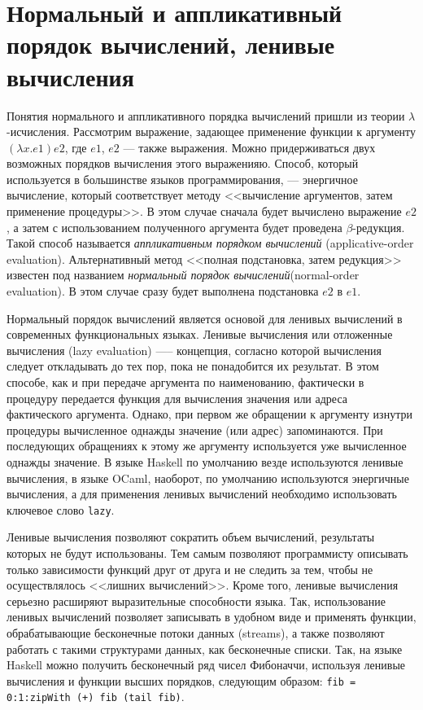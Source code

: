 \documentclass[a4paper]{article}
\begin{document}
\section{Нормальный и аппликативный порядок вычислений, ленивые
  вычисления}
Понятия нормального и аппликативного порядка вычислений пришли из
теории $\lambda$-исчисления. Рассмотрим выражение, задающее
применение функции к аргументу $(\lambda x. e1) e2$, где $e1$, $e2$
--- также выражения. Можно придерживаться двух возможных порядков
вычисления этого выраженияю. Способ, который используется в
большинстве языков программирования, --- энергичное вычисление,
который соответствует методу <<вычисление аргументов, затем применение
процедуры>>. В этом случае сначала будет вычислено выражение $e2$, а
затем с использованием полученного аргумента будет проведена
$\beta$-редукция. Такой способ называется \emph{аппликативным порядком
вычислений} (applicative-order evaluation).
Альтернативный метод <<полная подстановка, затем редукция>> известен
под названием \emph{нормальный порядок вычислений}(normal-order
evaluation). В этом случае сразу будет выполнена подстановка $e2$ в
$e1$.

Нормальный порядок вычислений является основой для ленивых вычислений
в современных функциональных языках. Ленивые вычисления или отложенные
вычисления (lazy evaluation) —-- концепция, согласно которой
вычисления следует откладывать до тех пор, пока не понадобится их
результат. В этом способе, как и при передаче аргумента по
наименованию, фактически в процедуру передается функция для вычисления
значения или адреса фактического аргумента. Однако, при первом же
обращении к аргументу изнутри процедуры вычисленное однажды значение
(или адрес) запоминаются. При последующих обращениях к этому же
аргументу используется уже вычисленное однажды значение. В языке
Haskell по умолчанию везде используются ленивые вычисления, в языке
OCaml, наоборот, по умолчанию используются энергичные вычисления, а
для применения ленивых вычислений необходимо использовать ключевое
слово \texttt{lazy}.

Ленивые вычисления позволяют сократить объем вычислений, результаты
которых не будут использованы. Тем самым позволяют программисту
описывать только зависимости функций друг от друга и не следить за
тем, чтобы не осуществлялось <<лишних вычислений>>. Кроме того,
ленивые вычисления серьезно расширяют выразительные способности языка.
Так, использование ленивых вычислений позволяет записывать в удобном
виде и применять функции, обрабатывающие бесконечные потоки данных
(streams), а также позволяют работать с такими структурами данных, как
бесконечные списки. Так, на языке Haskell можно получить бесконечный
ряд чисел Фибоначчи, используя ленивые вычисления и функции высших
порядков, следующим образом: \verb|fib = 0:1:zipWith (+) fib (tail fib)|.
\end{document}
